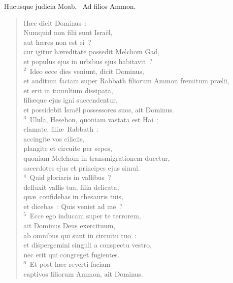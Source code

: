  Hucusque judicia Moab.
~Ad filios Ammon. \begin{flushleft}\begin{verse}\vspace{6pt}H\ae c dicit Dominus~:\\ Numquid non filii sunt Isra\"el,\\ aut h\ae res non est ei~?\\ cur igitur h\ae reditate possedit Melchom Gad,\\ et populus ejus in urbibus ejus habitavit~?\\
${}^{2}$~Ideo ecce dies veniunt, dicit Dominus,\\ et auditum faciam super Rabbath filiorum Ammon fremitum pr\ae lii,\\ et erit in tumultum dissipata,\\ fili\ae que ejus igni succendentur,\\ et possidebit Isra\"el possessores suos, ait Dominus.\\
${}^{3}$~Ulula, Hesebon, quoniam vastata est Hai~;\\ clamate, fili\ae\ Rabbath~:\\ accingite vos ciliciis,\\ plangite et circuite per sepes,\\ quoniam Melchom in transmigrationem ducetur,\\ sacerdotes ejus et principes ejus simul.\\
${}^{4}$~Quid gloriaris in vallibus~?\\ defluxit vallis tua, filia delicata,\\ qu\ae\ confidebas in thesauris tuis,\\ et dicebas~: Quis veniet ad me~?\\
${}^{5}$~Ecce ego inducam super te terrorem,\\ ait Dominus Deus exercituum,\\ ab omnibus qui sunt in circuitu tuo~:\\ et dispergemini singuli a conspectu vestro,\\ nec erit qui congreget fugientes.\\
${}^{6}$~Et post h\ae c reverti faciam\\ captivos filiorum Ammon, ait Dominus.\end{verse}\end{flushleft}


